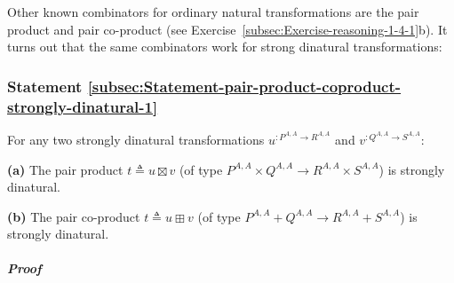 Other known combinators for ordinary natural transformations are the
pair product and pair co-product (see Exercise~\ref{subsec:Exercise-reasoning-1-4-1}b).
It turns out that the same combinators work for strong dinatural transformations:

\subsubsection{Statement \label{subsec:Statement-pair-product-coproduct-strongly-dinatural-1}\ref{subsec:Statement-pair-product-coproduct-strongly-dinatural-1}}

For any two strongly dinatural transformations $u^{:P^{A,A}\rightarrow R^{A,A}}$
and $v^{:Q^{A,A}\rightarrow S^{A,A}}$:

\textbf{(a)} The pair product $t\triangleq u\boxtimes v$ (of type
$P^{A,A}\times Q^{A,A}\rightarrow R^{A,A}\times S^{A,A}$) is strongly
dinatural.

\textbf{(b)} The pair co-product
$t\triangleq u\boxplus v$ (of type $P^{A,A}+Q^{A,A}\rightarrow R^{A,A}+S^{A,A}$)
is strongly dinatural.

\subparagraph{Proof}

